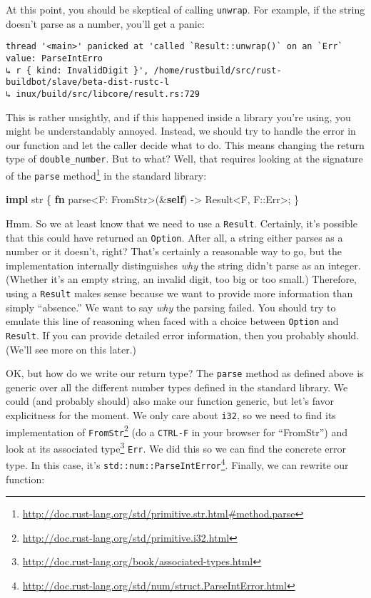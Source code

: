 \documentclass[a4paper,]{book}
\newenvironment{Shaded}{\begin{snugshade}}{\end{snugshade}}
\newcommand{\KeywordTok}[1]{\textcolor[rgb]{0.13,0.29,0.53}{\textbf{{#1}}}}
\newcommand{\DataTypeTok}[1]{\textcolor[rgb]{0.13,0.29,0.53}{{#1}}}
\newcommand{\ConstantTok}[1]{\textcolor[rgb]{0.00,0.00,0.00}{{#1}}}
\newcommand{\NormalTok}[1]{{#1}}
\renewcommand{\href}[2]{#2\footnote{\url{#1}}}
\begin{document}
At this point, you should be skeptical of calling \texttt{unwrap}. For
example, if the string doesn't parse as a number, you'll get a panic:

\begin{verbatim}
thread '<main>' panicked at 'called `Result::unwrap()` on an `Err` value: ParseIntErro
↳ r { kind: InvalidDigit }', /home/rustbuild/src/rust-buildbot/slave/beta-dist-rustc-l
↳ inux/build/src/libcore/result.rs:729
\end{verbatim}

This is rather unsightly, and if this happened inside a library you're
using, you might be understandably annoyed. Instead, we should try to
handle the error in our function and let the caller decide what to do.
This means changing the return type of \texttt{double\_number}. But to
what? Well, that requires looking at the signature of the
\href{http://doc.rust-lang.org/std/primitive.str.html\#method.parse}{\texttt{parse}
method} in the standard library:

\begin{Shaded}
\begin{Highlighting}[]
\KeywordTok{impl} \DataTypeTok{str} \NormalTok{\{}
    \KeywordTok{fn} \NormalTok{parse<F: FromStr>(&}\KeywordTok{self}\NormalTok{) -> }\DataTypeTok{Result}\NormalTok{<F, F::}\ConstantTok{Err}\NormalTok{>;}
\NormalTok{\}}
\end{Highlighting}
\end{Shaded}

Hmm. So we at least know that we need to use a \texttt{Result}.
Certainly, it's possible that this could have returned an
\texttt{Option}. After all, a string either parses as a number or it
doesn't, right? That's certainly a reasonable way to go, but the
implementation internally distinguishes \emph{why} the string didn't
parse as an integer. (Whether it's an empty string, an invalid digit,
too big or too small.) Therefore, using a \texttt{Result} makes sense
because we want to provide more information than simply ``absence.'' We
want to say \emph{why} the parsing failed. You should try to emulate
this line of reasoning when faced with a choice between \texttt{Option}
and \texttt{Result}. If you can provide detailed error information, then
you probably should. (We'll see more on this later.)

OK, but how do we write our return type? The \texttt{parse} method as
defined above is generic over all the different number types defined in
the standard library. We could (and probably should) also make our
function generic, but let's favor explicitness for the moment. We only
care about \texttt{i32}, so we need to
\href{http://doc.rust-lang.org/std/primitive.i32.html}{find its
implementation of \texttt{FromStr}} (do a \texttt{CTRL-F} in your
browser for ``FromStr'') and look at its
\href{http://doc.rust-lang.org/book/associated-types.html}{associated
type} \texttt{Err}. We did this so we can find the concrete error type.
In this case, it's
\href{http://doc.rust-lang.org/std/num/struct.ParseIntError.html}{\texttt{std::num::ParseIntError}}.
Finally, we can rewrite our function:
\end{document}
